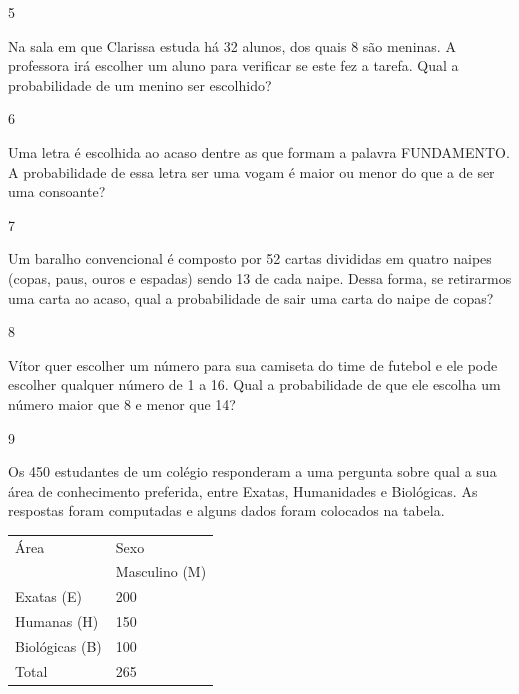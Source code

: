 \begin{escolha}
{\begin{escolha}
\begin{escolha}
\end{escolha}

\num{5}

Na sala em que Clarissa estuda há 32 alunos, dos quais 8 são meninas. A
professora irá escolher um aluno para verificar se este fez a tarefa.
Qual a probabilidade de um menino ser escolhido?


\num{6}

Uma letra é escolhida ao acaso dentre as que formam a palavra
FUNDAMENTO. A probabilidade de essa letra ser uma vogam é maior ou menor do que a de ser uma consoante?


\num{7}

Um baralho convencional é composto por 52 cartas divididas em quatro
naipes (copas, paus, ouros e espadas) sendo 13 de cada naipe. Dessa
forma, se retirarmos uma carta ao acaso, qual a probabilidade de sair
uma carta do naipe de copas?


\num{8}

Vítor quer escolher um número para sua camiseta do time de futebol e ele
pode escolher qualquer número de 1 a 16. Qual a probabilidade de que ele
escolha um número maior que 8 e menor que 14?


\num{9}

Os 450 estudantes de um colégio responderam a uma pergunta sobre qual a
sua área de conhecimento preferida, entre Exatas, Humanidades e
Biológicas. As respostas foram computadas e alguns dados foram colocados
na tabela.

\begin{longtable}[]{@{}ll@{}}
\toprule
Área & Sexo\tabularnewline
& Masculino (M)\tabularnewline
Exatas (E) & 200\tabularnewline
Humanas (H) & 150\tabularnewline
Biológicas (B) & 100\tabularnewline
Total & 265\tabularnewline
\bottomrule
\end{longtable}


\end{escolha}}
\end{escolha}
